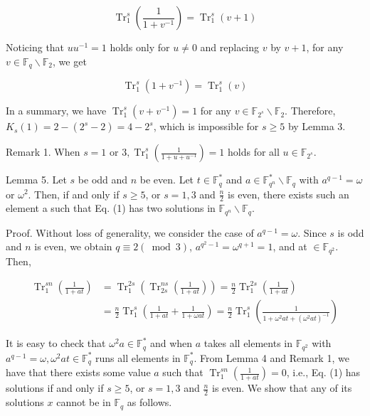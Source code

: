 \documentclass[10pt]{article}
\begin{document}
$$
\operatorname{Tr}_{1}^{s}\left(\frac{1}{1+v^{-1}}\right)=\operatorname{Tr}_{1}^{s}(v+1)
$$

Noticing that $u u^{-1}=1$ holds only for $u \neq 0$ and replacing $v$ by $v+1$, for any $v \in \mathbb{F}_{q} \backslash \mathbb{F}_{2}$, we get

$$
\operatorname{Tr}_{1}^{s}\left(1+v^{-1}\right)=\operatorname{Tr}_{1}^{s}(v)
$$

In a summary, we have $\operatorname{Tr}_{1}^{s}\left(v+v^{-1}\right)=1$ for any $v \in \mathbb{F}_{2^{s}} \backslash \mathbb{F}_{2}$. Therefore, $K_{s}(1)=2-\left(2^{s}-2\right)=4-2^{s}$, which is impossible for $s \geqslant 5$ by Lemma 3.

Remark 1. When $s=1$ or $3, \operatorname{Tr}_{1}^{s}\left(\frac{1}{1+u+u^{-1}}\right)=1$ holds for all $u \in \mathbb{F}_{2^{s}}$.

Lemma 5. Let $s$ be odd and $n$ be even. Let $t \in \mathbb{F}_{q}^{*}$ and $a \in \mathbb{F}_{q^{n}}^{*} \backslash \mathbb{F}_{q}$ with $a^{q-1}=\omega$ or $\omega^{2}$. Then, if and only if $s \geqslant 5$, or $s=1,3$ and $\frac{n}{2}$ is even, there exists such an element a such that Eq. (1) has two solutions in $\mathbb{F}_{q^{n}} \backslash \mathbb{F}_{q}$.

Proof. Without loss of generality, we consider the case of $a^{q-1}=\omega$. Since $s$ is odd and $n$ is even, we obtain $q \equiv 2(\bmod 3)$, $a^{q^{2}-1}=\omega^{q+1}=1$, and at $\in \mathbb{F}_{q^{2}}$. Then,

$$
\begin{aligned}
\operatorname{Tr}_{1}^{s n}\left(\frac{1}{1+a t}\right) & =\operatorname{Tr}_{1}^{2 s}\left(\operatorname{Tr}_{2 s}^{n s}\left(\frac{1}{1+a t}\right)\right)=\frac{n}{2} \operatorname{Tr}_{1}^{2 s}\left(\frac{1}{1+a t}\right) \\
& =\frac{n}{2} \operatorname{Tr}_{1}^{s}\left(\frac{1}{1+a t}+\frac{1}{1+\omega a t}\right)=\frac{n}{2} \operatorname{Tr}_{1}^{s}\left(\frac{1}{1+\omega^{2} a t+\left(\omega^{2} a t\right)^{-1}}\right)
\end{aligned}
$$

It is easy to check that $\omega^{2} a \in \mathbb{F}_{q}^{*}$ and when $a$ takes all elements in $\mathbb{F}_{q^{2}}$ with $a^{q-1}=\omega, \omega^{2} a t \in \mathbb{F}_{q}^{*}$ runs all elements in $\mathbb{F}_{q}^{*}$. From Lemma 4 and Remark 1, we have that there exists some value $a$ such that $\operatorname{Tr}_{1}^{s n}\left(\frac{1}{1+a t}\right)=0$, i.e., Eq. (1) has solutions if and only if $s \geqslant 5$, or $s=1,3$ and $\frac{n}{2}$ is even. We show that any of its solutions $x$ cannot be in $\mathbb{F}_{q}$ as follows.
\end{document}
